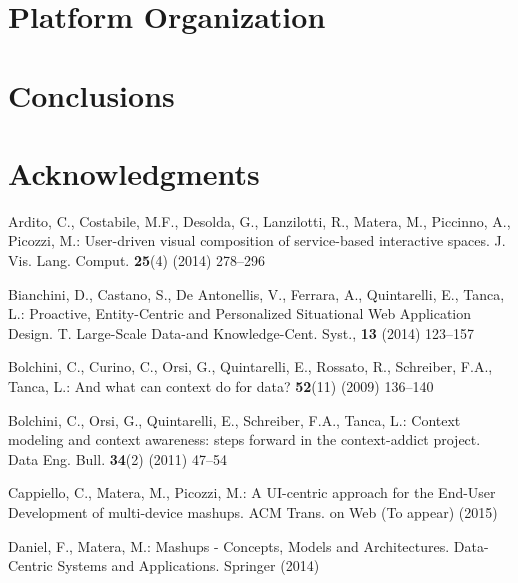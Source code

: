 \documentclass{llncs}
\begin{document}
\section{Platform Organization}


\section{Conclusions}


\section{Acknowledgments}



%
%

%

\begin{thebibliography}{1}

Ardito, C., Costabile, M.F., Desolda, G., Lanzilotti, R., Matera, M., Piccinno,
  A., Picozzi, M.:
\newblock User-driven visual composition of service-based interactive spaces.
\newblock J. Vis. Lang. Comput. \textbf{25}(4) (2014)  278--296

Bianchini, D., Castano, S., De Antonellis, V., Ferrara, A., Quintarelli, E., Tanca, L.:
 Proactive, Entity-Centric and Personalized Situational Web Application Design.
\newblock T. Large-Scale Data-and Knowledge-Cent. Syst., \textbf{13} (2014) 123--157

Bolchini, C., Curino, C., Orsi, G., Quintarelli, E., Rossato, R., Schreiber,
  F.A., Tanca, L.:
\newblock And what can context do for data?
 \textbf{52}(11) (2009)  136--140

Bolchini, C., Orsi, G., Quintarelli, E., Schreiber, F.A., Tanca, L.:
\newblock Context modeling and context awareness: steps forward in the
  context-addict project.
 Data Eng. Bull. \textbf{34}(2) (2011)  47--54

Cappiello, C., Matera, M., Picozzi, M.:
\newblock A {UI}-centric approach for the {End-User Development} of
  multi-device mashups.
\newblock ACM Trans. on Web (To appear) (2015)

Daniel, F., Matera, M.:
\newblock Mashups - Concepts, Models and Architectures.
\newblock Data-Centric Systems and Applications. Springer (2014)

\end{thebibliography}
\end{document}
